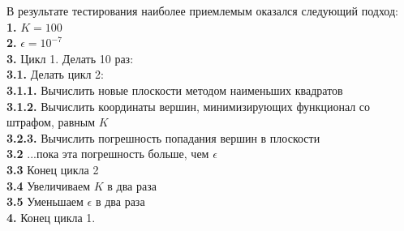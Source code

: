 \documentclass[a4paper,12pt, titlepage]{article}
\begin{document}
\begin{flushleft}
 В результате тестирования наиболее приемлемым оказался следующий подход:\\
	\textbf{1. }$K = 100$\\
	\textbf{2. }$\epsilon = 10^{-7}$\\
	\textbf{3. }Цикл 1. Делать 10 раз:\\
	\textbf{3.1. }Делать цикл 2: \\
	\textbf{3.1.1. }Вычислить новые плоскости методом наименьших квадратов\\
	\textbf{3.1.2. }Вычислить координаты вершин, минимизирующих функционал со штрафом, равным $K$\\
	\textbf{3.2.3. }Вычислить погрешность попадания вершин в плоскости\\
	\textbf{3.2 }...пока эта погрешность больше, чем $\epsilon$\\
	\textbf{3.3 }Конец цикла 2\\
	\textbf{3.4 }Увеличиваем $K$ в два раза\\
	\textbf{3.5 }Уменьшаем $\epsilon$ в два раза\\
	\textbf{4. }Конец цикла 1.\\
\end{flushleft}
\end{document}
